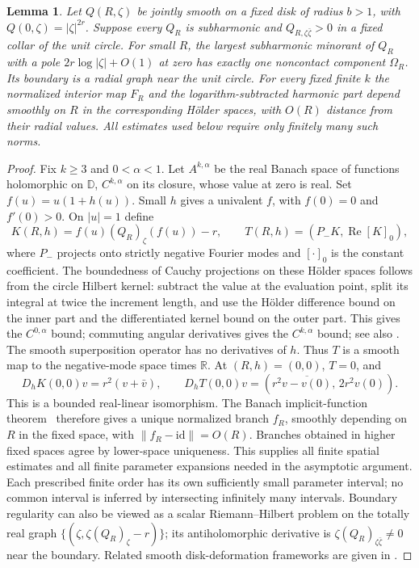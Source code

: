 \documentclass[11pt]{article}
\newtheorem{lemma}[theorem]{Lemma}
\theoremstyle{remark}\newtheorem{remark}[theorem]{Remark}
\newcommand{\D}{\mathbb D}
\newcommand{\R}{\mathbb R}
\DeclareMathOperator{\Rea}{Re}
\begin{document}
\begin{lemma}\label{lem:hole}
Let $Q(R,\zeta)$ be jointly smooth on a fixed disk of radius $b>1$,
with $Q(0,\zeta)=|\zeta|^{2r}$. Suppose every $Q_R$ is subharmonic
and $Q_{R,\zeta\bar\zeta}>0$ in a fixed collar of the unit circle.
For small $R$, the largest subharmonic minorant of $Q_R$ with a pole
$2r\log|\zeta|+O(1)$ at zero has exactly one noncontact component
$\Omega_R$. Its boundary is a radial graph near the unit circle. For
every fixed finite $k$ the normalized interior map $F_R$ and the
logarithm-subtracted harmonic part depend smoothly on $R$ in the
corresponding H\"older spaces, with $O(R)$ distance from their radial
values. All estimates used below require only finitely many such norms.
\end{lemma}
\begin{proof}
Fix $k\geq3$ and $0<\alpha<1$. Let $A^{k,\alpha}$ be the real Banach
space of functions holomorphic on $\D$, $C^{k,\alpha}$ on its closure,
whose value at zero is real. Set $f(u)=u(1+h(u))$. Small $h$ gives a
univalent $f$, with $f(0)=0$ and $f'(0)>0$. On $|u|=1$ define
\[
 K(R,h)=f(u)(Q_R)_\zeta(f(u))-r,
 \qquad T(R,h)=(P_-K,\Rea[K]_0),
\]
where $P_-$ projects onto strictly negative Fourier modes and $[\cdot]_0$
is the constant coefficient. The boundedness of Cauchy projections on
these H\"older spaces follows from the circle Hilbert kernel: subtract
the value at the evaluation point, split its integral at twice the
increment length, and use the H\"older difference bound on the inner
part and the differentiated kernel bound on the outer part. This gives
the $C^{0,\alpha}$ bound; commuting angular derivatives gives the
$C^{k,\alpha}$ bound; see also \cite[Theorem 1.2]{WD}.
The smooth superposition operator has no derivatives
of $h$. Thus $T$ is a smooth map to the negative-mode space times $\R$.
At $(R,h)=(0,0)$, $T=0$, and
\[
 D_hK(0,0)v=r^2(v+\bar v),\qquad
 D_hT(0,0)v=(r^2\overline{v-v(0)},\,2r^2v(0)).
\]
This is a bounded real-linear isomorphism. The Banach implicit-function
theorem~\cite[Theorem 2]{K} therefore gives a unique normalized branch $f_R$, smoothly
depending on $R$ in the fixed space, with $\|f_R-\mathrm{id}\|=O(R)$.
Branches obtained in higher fixed spaces agree by lower-space uniqueness.
This supplies all finite spatial estimates and all finite parameter
expansions needed in the asymptotic argument. Each prescribed finite
order has its own sufficiently small parameter interval; no common
interval is inferred by intersecting infinitely many intervals.
Boundary regularity can
also be viewed as a scalar Riemann--Hilbert problem on the totally real
graph $\{(\zeta,\zeta(Q_R)_\zeta-r)\}$; its antiholomorphic derivative
is $\zeta(Q_R)_{\zeta\bar\zeta}\ne0$ near the boundary. Related smooth
disk-deformation frameworks are given in \cite{F,L,RWN}.


\end{proof}
\end{document}

